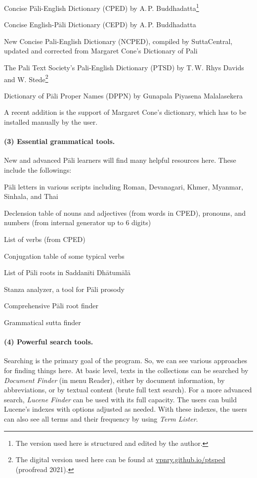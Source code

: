 \begin{compactitem}
\item Concise Pāli-English Dictionary (CPED) by A.\,P. Buddhadatta\footnote{The version used here is structured and edited by the author.}
\item Concise English-Pāli Dictionary (CEPD) by A.\,P. Buddhadatta
\item New Concise Pali-English Dictionary (NCPED), compiled by SuttaCentral, updated and corrected from Margaret Cone's Dictionary of Pali
\item The Pali Text Society's Pali-English Dictionary (PTSD) by T.\,W. Rhys Davids and W. Stede\footnote{The digital version used here can be found at \url{vpnry.github.io/ptsped} (proofread 2021).}
\item Dictionary of Pāli Proper Names (DPPN) by Gunapala Piyasena Malalasekera
\end{compactitem}

A recent addition is the support of Margaret Cone's dictionary, which has to be installed manually by the user.

\paragraph{(3) Essential grammatical tools.} New and advanced Pāli learners will find many helpful resources here. These include the followings:

\begin{compactitem}
\item Pāli letters in various scripts including Roman, Devanagari, Khmer, Myanmar, Sinhala, and Thai
\item Declension table of nouns and adjectives (from words in CPED), pronouns, and numbers (from internal generator up to 6 digits)
\item List of verbs (from CPED)
\item Conjugation table of some typical verbs
\item List of Pāli roots in Saddanīti Dhātumālā
\item Stanza analyzer, a tool for Pāli prosody
\item Comprehensive Pāli root finder
\item Grammatical sutta finder
\end{compactitem}

\paragraph{(4) Powerful search tools.} Searching is the primary goal of the program. So, we can see various approaches for finding things here. At basic level, texts in the collections can be searched by \emph{Document Finder} (in menu Reader), either by document information, by abbreviations, or by textual content (brute full text search). For a more advanced search, \emph{Lucene Finder} can be used with its full capacity. The users can build Lucene's indexes with options adjusted as needed. With these indexes, the users can also see all terms and their frequency by using \emph{Term Lister}.

